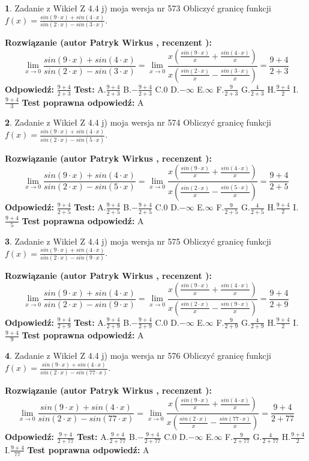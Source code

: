 \documentclass[12pt, a4paper]{article}
\theoremstyle{definition} %
\newtheorem{zad}{}
\newcommand{\zadStart}[1]{\begin{zad}#1\newline}
\newcommand{\zadStop}{\end{zad}}
\newcommand{\rozwStart}[2]{\noindent \textbf{Rozwiązanie (autor #1 , recenzent #2): }\newline}
\newcommand{\rozwStop}{\newline}
\newcommand{\odpStart}{\noindent \textbf{Odpowiedź:}\newline}
\newcommand{\odpStop}{\newline}
\newcommand{\testStart}{\noindent \textbf{Test:}\newline}
\newcommand{\testStop}{\newline}
\newcommand{\kluczStart}{\noindent \textbf{Test poprawna odpowiedź:}\newline}
\newcommand{\kluczStop}{\newline}
\begin{document}
\zadStart{Zadanie z Wikieł Z 4.4 j) moja wersja nr 573}
Obliczyć granicę funkcji $f(x)=\frac{sin(9\cdot x) +sin(4\cdot x)}{sin(2\cdot x) -sin(3\cdot x)}$.
\zadStop
\rozwStart{Patryk Wirkus}{}
$$\lim\limits_{x\to 0}\frac{sin(9\cdot x) +sin(4\cdot x)}{sin(2\cdot x) -sin(3\cdot x)}=\lim\limits_{x\to 0}\frac{x(\frac{sin(9\cdot x)}{x}+\frac{sin(4\cdot x)}{x})}{x(\frac{sin(2\cdot x)}{x}-\frac{sin(3\cdot x)}{x})}=\frac{9+4}{2+3}$$
\rozwStop
\odpStart
$\frac{9+4}{2+3}$
\odpStop
\testStart
A.$\frac{9+4}{2+3}$
B.$-\frac{9+4}{2+3}$
C.$0$
D.$-\infty$
E.$\infty$
F.$\frac{9}{2+3}$
G.$\frac{4}{2+3}$
H.$\frac{9+4}{2}$
I.$\frac{9+4}{3}$
\testStop
\kluczStart
A
\kluczStop



\zadStart{Zadanie z Wikieł Z 4.4 j) moja wersja nr 574}
Obliczyć granicę funkcji $f(x)=\frac{sin(9\cdot x) +sin(4\cdot x)}{sin(2\cdot x) -sin(5\cdot x)}$.
\zadStop
\rozwStart{Patryk Wirkus}{}
$$\lim\limits_{x\to 0}\frac{sin(9\cdot x) +sin(4\cdot x)}{sin(2\cdot x) -sin(5\cdot x)}=\lim\limits_{x\to 0}\frac{x(\frac{sin(9\cdot x)}{x}+\frac{sin(4\cdot x)}{x})}{x(\frac{sin(2\cdot x)}{x}-\frac{sin(5\cdot x)}{x})}=\frac{9+4}{2+5}$$
\rozwStop
\odpStart
$\frac{9+4}{2+5}$
\odpStop
\testStart
A.$\frac{9+4}{2+5}$
B.$-\frac{9+4}{2+5}$
C.$0$
D.$-\infty$
E.$\infty$
F.$\frac{9}{2+5}$
G.$\frac{4}{2+5}$
H.$\frac{9+4}{2}$
I.$\frac{9+4}{5}$
\testStop
\kluczStart
A
\kluczStop



\zadStart{Zadanie z Wikieł Z 4.4 j) moja wersja nr 575}
Obliczyć granicę funkcji $f(x)=\frac{sin(9\cdot x) +sin(4\cdot x)}{sin(2\cdot x) -sin(9\cdot x)}$.
\zadStop
\rozwStart{Patryk Wirkus}{}
$$\lim\limits_{x\to 0}\frac{sin(9\cdot x) +sin(4\cdot x)}{sin(2\cdot x) -sin(9\cdot x)}=\lim\limits_{x\to 0}\frac{x(\frac{sin(9\cdot x)}{x}+\frac{sin(4\cdot x)}{x})}{x(\frac{sin(2\cdot x)}{x}-\frac{sin(9\cdot x)}{x})}=\frac{9+4}{2+9}$$
\rozwStop
\odpStart
$\frac{9+4}{2+9}$
\odpStop
\testStart
A.$\frac{9+4}{2+9}$
B.$-\frac{9+4}{2+9}$
C.$0$
D.$-\infty$
E.$\infty$
F.$\frac{9}{2+9}$
G.$\frac{4}{2+9}$
H.$\frac{9+4}{2}$
I.$\frac{9+4}{9}$
\testStop
\kluczStart
A
\kluczStop



\zadStart{Zadanie z Wikieł Z 4.4 j) moja wersja nr 576}
Obliczyć granicę funkcji $f(x)=\frac{sin(9\cdot x) +sin(4\cdot x)}{sin(2\cdot x) -sin(77\cdot x)}$.
\zadStop
\rozwStart{Patryk Wirkus}{}
$$\lim\limits_{x\to 0}\frac{sin(9\cdot x) +sin(4\cdot x)}{sin(2\cdot x) -sin(77\cdot x)}=\lim\limits_{x\to 0}\frac{x(\frac{sin(9\cdot x)}{x}+\frac{sin(4\cdot x)}{x})}{x(\frac{sin(2\cdot x)}{x}-\frac{sin(77\cdot x)}{x})}=\frac{9+4}{2+77}$$
\rozwStop
\odpStart
$\frac{9+4}{2+77}$
\odpStop
\testStart
A.$\frac{9+4}{2+77}$
B.$-\frac{9+4}{2+77}$
C.$0$
D.$-\infty$
E.$\infty$
F.$\frac{9}{2+77}$
G.$\frac{4}{2+77}$
H.$\frac{9+4}{2}$
I.$\frac{9+4}{77}$
\testStop
\kluczStart
A
\kluczStop
\end{document}
